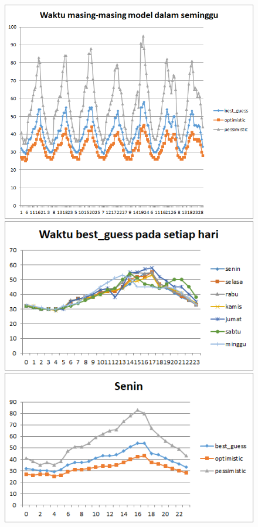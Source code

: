 \begin{figure}[H]
				\centering		
				\includegraphics[scale=0.7]{Gambar/waktuallmodelsampel224072017normal.png}
				\includegraphics[]{Gambar/waktubestguesssampel224072017normal.png}
				\includegraphics[]{Gambar/seninsampel224072017normal.png}
\end{figure}
			
